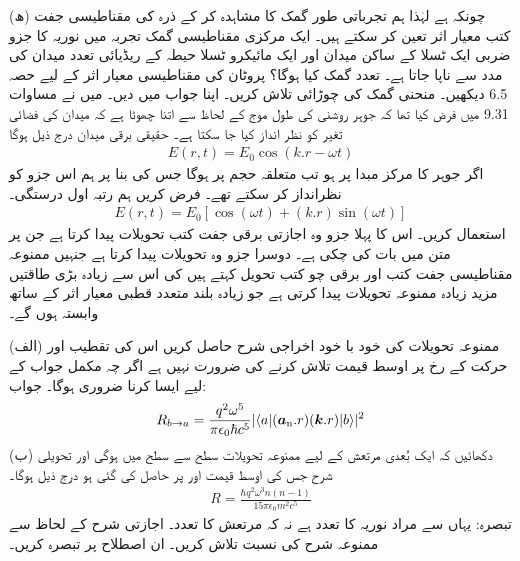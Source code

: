(ھ) چونکہ  ہے لہٰذا ہم تجرباتی طور گمک کا مشاہدہ کر کے ذرہ کی مقناطیسی جفت کتب معیار اثر تعین کر سکتے ہیں۔ ایک مرکزی مقناطیسی گمک تجربہ میں نوریہ کا  جزو ضربی ایک ٹسلا کے ساکن میدان اور ایک مائیکرو  ٹسلا حیطہ کے ریڈیائی تعدد میدان کی مدد سے ناپا جاتا ہے۔ تعدد گمک کیا ہوگا؟ پروٹان کی مقناطیسی معیار اثر کے لیے حصہ  \num{6.5} دیکھیں۔ منحنی گمک کی چوڑائی تلاش کریں۔ اپنا جواب  میں دیں۔
میں نے مساوات \num{9.31} میں فرض کیا تھا کہ جوہر روشنی کی طول موج کے لحاظ سے اتنا چھوٹا ہے کہ میدان کی فضائی تغیر کو نظر انداز کیا جا سکتا ہے۔ حقیقی برقی میدان درج ذیل ہوگا
\begin{align}
	E(r,t) = E_0\cos(k.r-\omega t)
\end{align}
اگر جوہر کا مرکز مبدا پر ہو تب متعلقہ حجم پر   ہوگا جس کی بنا پر ہم اس جزو کو نظرانداز کر سکتے تھے۔ فرض کریں ہم رتبہ اول درستگی۔
\begin{align}
	E(r,t) = E_0[\cos(\omega t)+(k.r)\sin(\omega t)]
\end{align}
استعمال کریں۔ اس کا پہلا جزو وہ اجازتی برقی جفت کتب تحویلات پیدا کرتا ہے جن پر متن میں بات کی چکی ہے۔ دوسرا جزو وہ تحویلات پیدا کرتا ہے جنہیں ممنوعہ مقناطیسی جفت کتب اور برقی چو کتب تحویل کہتے ہیں  کی اس سے زیادہ بڑی طاقتیں مزید زیادہ ممنوعہ تحویلات پیدا کرتی ہے جو زیادہ بلند متعدد قطبی معیار اثر کے ساتھ وابستہ ہوں گے۔

(الف) ممنوعہ تحویلات کی خود با خود اخراجی شرح حاصل کریں اس کی تقطیب اور حرکت کے رخ پر اوسط قیمت تلاش کرنے کی ضرورت نہیں ہے اگر چہ مکمل جواب کے لیے ایسا کرنا ضروری ہوگا۔ جواب:
\begin{align}
	R_{b\rightarrow a} = \frac{q^2\omega^5}{\pi\epsilon_0\hbar c^5}|\langle a|({{\boldsymbol{a}}_{\textup{n}}}.r)({\boldsymbol{k}}.r)|b \rangle|^2
\end{align}
(ب) دکھائیں کہ ایک بُعدی مرتعش کے لیے ممنوعہ تحویلات سطح  سے سطح  میں ہوگی اور تحویلی شرح جس کی اوسط قیمت  اور  پر حاصل کی گئی ہو درج ذیل ہوگا۔
\begin{align}
	R = \frac{\hbar q^2\omega^3n(n-1)}{15\pi\epsilon_0m^2c^5}
\end{align}
تبصرہ: یہاں  سے مراد نوریہ کا تعدد ہے نہ کہ مرتعش کا تعدد۔ اجازتی شرح کے لحاظ سے ممنوعہ شرح کی  نسبت  تلاش کریں۔ ان اصطلاح پر تبصرہ کریں۔

